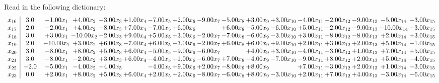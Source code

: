 \documentclass[9pt]{article}
\begin{document}
Read in the following dictionary:
\[\begin{array}{c| c c@{\hskip 2pt} c@{\hskip 2pt} c@{\hskip 2pt} c@{\hskip 2pt} c@{\hskip 2pt} c@{\hskip 2pt} c@{\hskip 2pt} c@{\hskip 2pt} c@{\hskip 2pt} c@{\hskip 2pt} c@{\hskip 2pt} c@{\hskip 2pt} c@{\hskip 2pt} c@{\hskip 2pt} c@{\hskip 2pt} }
 x_{16}   &  3.0 & -1.00 x_{1} & +  4.00 x_{2} & -3.00 x_{3} & +  1.00 x_{4} & -7.00 x_{5} & +  2.00 x_{6} & -9.00 x_{7} & -5.00 x_{8} & +  3.00 x_{9} & +  3.00 x_{10} & -4.00 x_{11} & -2.00 x_{12} & -9.00 x_{13} & -5.00 x_{14} & -3.00 x_{15}\\
 x_{17}   &  2.0 & -2.00 x_{1} & +  4.00 x_{2} & -8.00 x_{3} & +  7.00 x_{4} & -7.00 x_{5} & +  6.00 x_{6} &   & +  6.00 x_{8} & -5.00 x_{9} & -6.00 x_{10} & +  5.00 x_{11} & -2.00 x_{12} & -9.00 x_{13} & -10.00 x_{14} & -3.00 x_{15}\\
 x_{18}   &  3.0 & +  3.00 x_{1} & -10.00 x_{2} & -2.00 x_{3} & +  9.00 x_{4} & +  5.00 x_{5} & +  3.00 x_{6} & -2.00 x_{7} & -7.00 x_{8} & -6.00 x_{9} & -3.00 x_{10} & +  3.00 x_{11} & -8.00 x_{12} & -8.00 x_{13} & +  2.00 x_{14} & +  3.00 x_{15}\\
 x_{19}   &  2.0 & -10.00 x_{1} & +  3.00 x_{2} & +  6.00 x_{3} & -7.00 x_{4} & +  6.00 x_{5} & -3.00 x_{6} & -2.00 x_{7} & +  6.00 x_{8} & +  6.00 x_{9} & +  9.00 x_{10} & +  2.00 x_{11} & +  3.00 x_{12} & +  2.00 x_{13} & +  5.00 x_{14} & -1.00 x_{15}\\
 x_{20}   &  3.0 & -8.00 x_{1} & +  8.00 x_{2} & +  5.00 x_{3} & +  6.00 x_{4} & -5.00 x_{5} & -9.00 x_{6} & -6.00 x_{7} &   & +  4.00 x_{9} & +  3.00 x_{10} & -4.00 x_{11} & -3.00 x_{12} & +  1.00 x_{13} & +  7.00 x_{14} & +  5.00 x_{15}\\
 x_{21}   &  3.0 & -8.00 x_{1} & -2.00 x_{2} & +  3.00 x_{3} & +  6.00 x_{4} & -4.00 x_{5} & +  1.00 x_{6} & -6.00 x_{7} & +  7.00 x_{8} & -4.00 x_{9} & -7.00 x_{10} & -9.00 x_{11} & +  8.00 x_{12} & +  2.00 x_{13} & +  5.00 x_{14} & -4.00 x_{15}\\
 x_{22}   &  -2.0 & -5.00 x_{1} & -4.00 x_{2} & -4.00 x_{3} &   & -4.00 x_{5} & +  9.00 x_{6} & +  2.00 x_{7} & -8.00 x_{8} & +  8.00 x_{9} &   & +  7.00 x_{11} & -3.00 x_{12} & +  2.00 x_{13} & +  1.00 x_{14} & -3.00 x_{15}\\
 x_{23}   &  0.0 & +  2.00 x_{1} & +  8.00 x_{2} & +  5.00 x_{3} & +  6.00 x_{4} & +  2.00 x_{5} & +  2.00 x_{6} & -8.00 x_{7} & -6.00 x_{8} & +  8.00 x_{9} & -3.00 x_{10} & +  2.00 x_{11} & +  7.00 x_{12} & +  4.00 x_{13} & -3.00 x_{14} & -6.00 x_{15}\\

\end{array}\]
\end{document}
